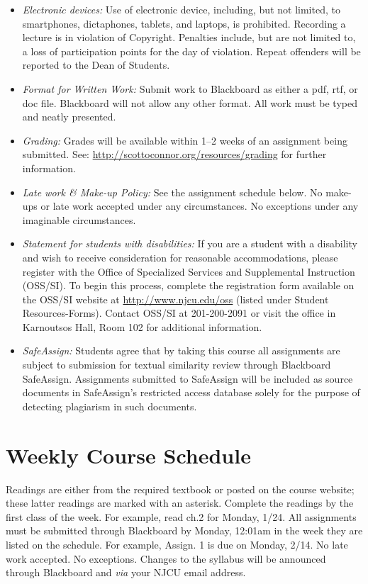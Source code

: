 \documentclass[article,oneside]{memoir}
\begin{document}
\begin{itemize}
\item \textit{Electronic devices:} Use of electronic device, including, but not limited, to smartphones, dictaphones, tablets, and laptops, is prohibited. Recording a lecture is in violation of Copyright. Penalties include, but are not limited to, a loss of participation points for the day of violation. Repeat offenders will be reported to the Dean of Students.

\item \textit{Format for Written Work:} Submit work to Blackboard as either a pdf, rtf, or doc file. Blackboard will not allow any other format. All work must be typed and neatly presented. 


\item \textit{Grading:} Grades will be available within 1--2 weeks of an assignment being submitted. See: \href{http://scottoconnor.org/resources/grading}{http://scottoconnor.org/resources/grading} for further information.


\item \textit{Late work \& Make-up Policy:} See the assignment schedule below. No make-ups or late work accepted under any circumstances. No exceptions under any imaginable circumstances.

\item \textit{Statement for students with disabilities:} If you are a student with a disability and wish to receive consideration for reasonable accommodations, please register with the Office of Specialized Services and Supplemental Instruction (OSS/SI). To begin this process, complete the registration form available on the OSS/SI website at \href{http://www.njcu.edu/oss}{http://www.njcu.edu/oss} (listed under Student Resources-Forms). Contact OSS/SI at 201-200-2091 or visit the office in Karnoutsos Hall, Room 102 for additional information.
 

\item \textit{SafeAssign:} Students agree that by taking this course all assignments are subject to submission for textual similarity review through Blackboard SafeAssign. Assignments submitted to SafeAssign will be included as source documents in SafeAssign's restricted access database solely for the purpose of detecting plagiarism in such documents.  


\end{itemize}



\newpage

\section{Weekly Course Schedule}
Readings are either from the required textbook or posted on the course website; these latter readings are marked with an asterisk. Complete the readings by the first class of the week. For example, read ch.2 for Monday, 1/24. All assignments must be submitted through Blackboard by Monday, 12:01am in the week they are listed on the schedule. For example, Assign. 1 is due on Monday, 2/14. No late work accepted. No exceptions.  
Changes to the syllabus will be announced through Blackboard and \emph{via} your NJCU email address.  
\end{document}
